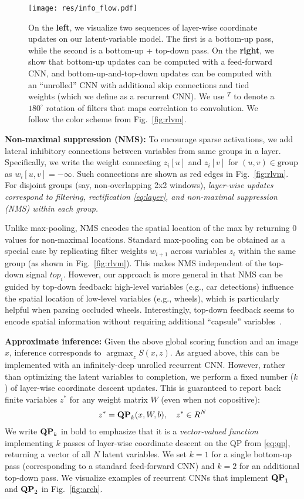 \documentclass[10pt,twocolumn,letterpaper]{article}
\DeclareMathOperator*{\argmax}{argmax}
\newcommand{\QP}[1]{{${\bf QP}_{#1}$}}
\begin{document}
\begin{figure}[t!]
  \centering
  \texttt{[image: res/info\_flow.pdf]}
\caption{On the {\bf left}, we visualize two sequences of layer-wise
    coordinate updates on our latent-variable model. The first is a
    bottom-up pass, while the second is a bottom-up + top-down
    pass. On the {\bf right}, we show that bottom-up updates can be
    computed with a feed-forward CNN, and bottom-up-and-top-down
    updates can be computed with an ``unrolled'' CNN with additional
    skip connections and tied weights (which we define as a recurrent
    CNN). We use $^T$ to denote a $180^\circ$ rotation of filters that
    maps correlation to convolution. We follow the color scheme from
    Fig.~\ref{fig:rlvm}.
  }\label{fig:info}
\end{figure}


{\bf Non-maximal suppression (NMS):} To encourage sparse activations,
we add lateral inhibitory connections between variables from same
groups in a layer. Specifically, we write the weight connecting
$z_i[u]$ and $z_i[v]$ for $(u,v) \in \text{group}$ as
$w_i[u,v] = -\infty$. Such connections are shown as red edges in
Fig.~\ref{fig:rlvm}. For disjoint groups (say, non-overlapping 2x2
windows), {\em layer-wise updates correspond to filtering,
  rectification \eqref{eq:layer}, and non-maximal suppression (NMS)
  within each group.}

Unlike max-pooling, NMS encodes the spatial location of the max by
returning 0 values for non-maximal locations. Standard max-pooling can
be obtained as a special case by replicating filter weights $w_{i+1}$
across variables $z_i$ within the same group (as shown in
Fig.~\ref{fig:rlvm}). This makes NMS independent of the top-down
signal $top_i$. However, our approach is more general in that NMS can
be guided by top-down feedback: high-level variables (e.g., car detections)
influence the spatial location of low-level
variables (e.g., wheels), which is particularly helpful when parsing occluded wheels. Interestingly, top-down feedback seems to encode
spatial information without requiring additional ``capsule''
variables~\cite{hinton2011transforming}.

{\bf Approximate inference:} Given the above global scoring function
and an image $x$, inference corresponds to $\argmax_zS(x,z)$. As
argued above, this can be implemented with an infinitely-deep unrolled
recurrent CNN. However, rather than optimizing the latent variables to
completion, we perform a fixed number ($k$) of layer-wise coordinate
descent updates. This is guaranteed to report back finite variables
$z^*$ for any weight matrix $W$ (even when not copositive):
\begin{align}
  z^* = {\bf QP}_k(x,W,b) \label{eq:infer}, \quad z^* \in R^N
\end{align}
We write ${\bf QP}_k$ in bold to emphasize that it is a {\em
  vector-valued function} implementing $k$ passes of layer-wise
coordinate descent on the QP from \eqref{eq:qp}, returning a vector of
all $N$ latent variables. We set $k=1$ for a single bottom-up pass
(corresponding to a standard feed-forward CNN) and $k=2$ for an
additional top-down pass. We visualize examples of recurrent CNNs that
implement \QP{1} and \QP{2} in Fig.~\ref{fig:arch}.
\end{document}
